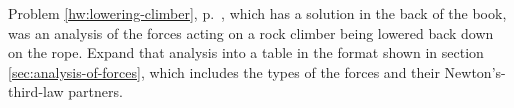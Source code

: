 Problem \ref{hw:lowering-climber}, p.~\pageref{hw:lowering-climber},
which has a solution in the back of the book, was an analysis of
the forces acting on a rock climber being lowered back down on the rope.
Expand that analysis into a table in the format shown in section \ref{sec:analysis-of-forces},
which includes the types of the forces and their Newton's-third-law partners.
